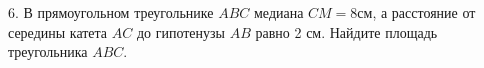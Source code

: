 6. В прямоугольном треугольнике $ABC$ медиана $CM=8$см, а расстояние от середины катета $AC$ до гипотенузы $AB$ равно 2 см. Найдите площадь треугольника $ABC.$\\
